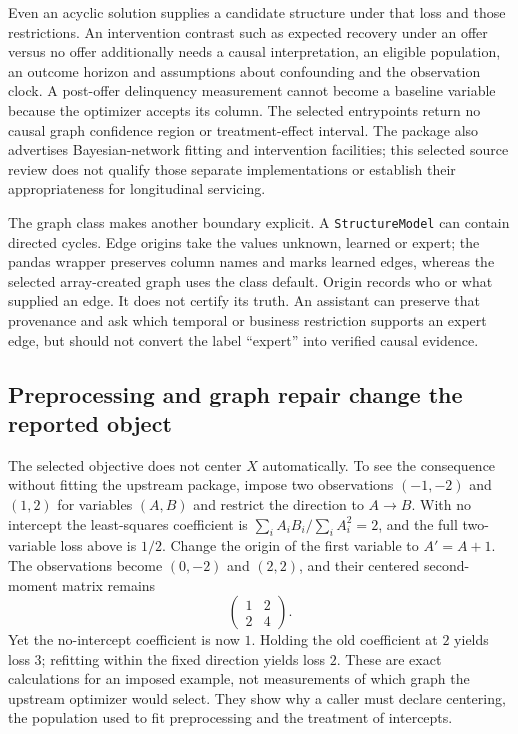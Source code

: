 Even an acyclic solution supplies a candidate structure under that loss and
those restrictions. An intervention contrast such as expected recovery under
an offer versus no offer additionally needs a causal interpretation, an
eligible population, an outcome horizon and assumptions about confounding and
the observation clock. A post-offer delinquency measurement cannot become a
baseline variable because the optimizer accepts its column. The selected
entrypoints return no causal graph confidence region or treatment-effect
interval. The package also advertises Bayesian-network fitting and
intervention facilities; this selected source review does not qualify those
separate implementations or establish their appropriateness for longitudinal
servicing.\citep{exec14_causalnex_primary}

The graph class makes another boundary explicit. A \texttt{StructureModel}
can contain directed cycles. Edge origins take the values unknown, learned
or expert; the pandas wrapper preserves column names and marks learned
edges, whereas the selected array-created graph uses the class default.
Origin records who or what supplied an edge. It does not certify its truth.
An assistant can preserve that provenance and ask which temporal or business
restriction supports an expert edge, but should not convert the label
``expert'' into verified causal evidence.\citep{exec14_causalnex_primary}

\subsection{Preprocessing and graph repair change the reported object}

The selected objective does not center $X$ automatically. To see the
consequence without fitting the upstream package, impose two observations
$(-1,-2)$ and $(1,2)$ for variables $(A,B)$ and restrict the direction to
$A\to B$. With no intercept the least-squares coefficient is
$\sum_i A_iB_i/\sum_i A_i^2=2$, and the full two-variable loss above is $1/2$.
Change the origin of the first variable to $A'=A+1$. The observations become
$(0,-2)$ and $(2,2)$, and their centered second-moment matrix remains
\[
 \begin{pmatrix}1&2\\2&4\end{pmatrix}.
\]
Yet the no-intercept coefficient is now $1$. Holding the old coefficient at
$2$ yields loss $3$; refitting within the fixed direction yields loss $2$.
These are exact calculations for an imposed example, not measurements of
which graph the upstream optimizer would select. They show why a caller must
declare centering, the population used to fit preprocessing and the treatment
of intercepts.\citep{exec14_causalnex_oracle}

